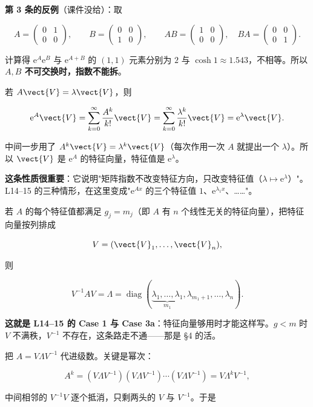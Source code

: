 \documentclass[11pt]{ctexart}
\newcommand{\mat}[1]{\begin{pmatrix}#1\end{pmatrix}}
\newcommand{\diag}{\operatorname{diag}}
\begin{document}
\textbf{第 3 条的反例}（课件没给）：取

\[
A=\mat{0&1\\0&0},\qquad B=\mat{0&0\\1&0},\qquad AB=\mat{1&0\\0&0},\quad BA=\mat{0&0\\0&1}.
\]

计算得 $\mathrm{e}^{A}\mathrm{e}^{B}$ 与 $\mathrm{e}^{A+B}$ 的 $(1,1)$ 元素分别为 $2$ 与 $\cosh1\approx1.543$，不相等。所以 \textbf{$A,B$ 不可交换时，指数不能拆}。


若 $A\vect{V}=\lambda\vect{V}$，则

\[
\mathrm{e}^{A}\vect{V}=\sum_{k=0}^{\infty}\frac{A^k}{k!}\vect{V}
=\sum_{k=0}^{\infty}\frac{\lambda^k}{k!}\vect{V}
=\mathrm{e}^{\lambda}\vect{V}.
\]

中间一步用了 $A^k\vect{V}=\lambda^k\vect{V}$（每次作用一次 $A$ 就提出一个 $\lambda$）。所以 $\vect{V}$ 是 $\mathrm{e}^{A}$ 的特征向量，特征值是 $\mathrm{e}^{\lambda}$。

\textbf{这条性质很重要}：它说明"矩阵指数不改变特征方向，只改变特征值（$\lambda\mapsto\mathrm{e}^{\lambda}$）"。L14--15 的三种情形，在这里变成"$\mathrm{e}^{Ax}$ 的三个特征值 $1$、$\mathrm{e}^{\lambda_1x}$、……"。



若 $A$ 的每个特征值都满足 $g_j=m_j$（即 $A$ 有 $n$ 个线性无关的特征向量），把特征向量按列排成

\[
V=(\vect{V}_1,\dots,\vect{V}_n),
\]

则

\[
V^{-1}AV=\Lambda=\diag(\underbrace{\lambda_1,\dots,\lambda_1}_{m_1},\lambda_{m_1+1},\dots,\lambda_n).
\]

\textbf{这就是 L14--15 的 Case 1 与 Case 3a}：特征向量够用时才能这样写。$g<m$ 时 $V$ 不满秩，$V^{-1}$ 不存在，这条路走不通——那是 §4 的活。


把 $A=V\Lambda V^{-1}$ 代进级数。关键是幂次：

\[
A^k=(V\Lambda V^{-1})(V\Lambda V^{-1})\cdots(V\Lambda V^{-1})=V\Lambda^kV^{-1},
\]

中间相邻的 $V^{-1}V$ 逐个抵消，只剩两头的 $V$ 与 $V^{-1}$。于是
\end{document}
